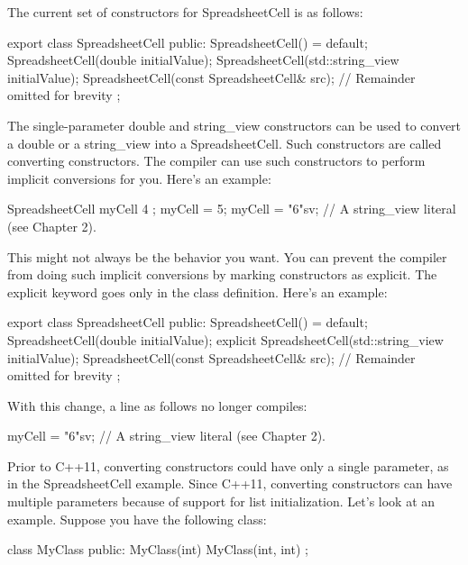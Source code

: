 The current set of constructors for SpreadsheetCell is as follows:

\begin{cpp}
export class SpreadsheetCell
{
    public:
        SpreadsheetCell() = default;
        SpreadsheetCell(double initialValue);
        SpreadsheetCell(std::string_view initialValue);
        SpreadsheetCell(const SpreadsheetCell& src);
    // Remainder omitted for brevity
};
\end{cpp}

The single-parameter double and string\_view constructors can be used to convert a double or a string\_view into a SpreadsheetCell. Such constructors are called converting constructors. The compiler can use such constructors to perform implicit conversions for you. Here’s an example:

\begin{cpp}
SpreadsheetCell myCell { 4 };
myCell = 5;
myCell = "6"sv; // A string_view literal (see Chapter 2).
\end{cpp}

This might not always be the behavior you want. You can prevent the compiler from doing such implicit conversions by marking constructors as explicit. The explicit keyword goes only in the class definition. Here’s an example:

\begin{cpp}
export class SpreadsheetCell
{
    public:
        SpreadsheetCell() = default;
        SpreadsheetCell(double initialValue);
        explicit SpreadsheetCell(std::string_view initialValue);
        SpreadsheetCell(const SpreadsheetCell& src);
    // Remainder omitted for brevity
};
\end{cpp}

With this change, a line as follows no longer compiles:

\begin{cpp}
myCell = "6"sv; // A string_view literal (see Chapter 2).
\end{cpp}

Prior to C++11, converting constructors could have only a single parameter, as in the SpreadsheetCell example. Since C++11, converting constructors can have multiple parameters because of support for list initialization. Let’s look at an example. Suppose you have the following class:

\begin{cpp}
class MyClass
{
    public:
        MyClass(int) { }
        MyClass(int, int) { }
};
\end{cpp}

